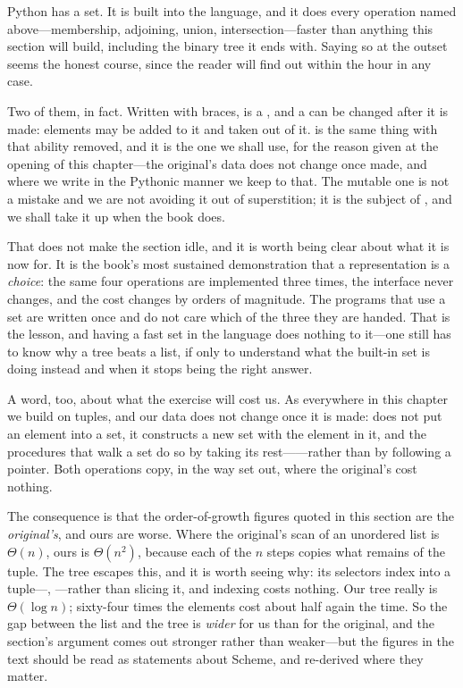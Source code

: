 \begin{revealTheSurface}
Python has a set.  It is built into the language, and it does every operation
named above---membership, adjoining, union, intersection---faster than anything
this section will build, including the binary tree it ends with.  Saying so at
the outset seems the honest course, since the reader will find out within the
hour in any case.

Two of them, in fact.  Written with braces,  is a ,
and a  can be changed after it is made: elements may be added to it
and taken out of it.   is the same thing with that
ability removed, and it is the one we shall use, for the reason given at the
opening of this chapter---the original's data does not change once made, and
where we write in the Pythonic manner we keep to that.  The mutable one is not
a mistake and we are not avoiding it out of superstition; it is the subject of
, and we shall take it up when the book does.

That does not make the section idle, and it is worth being clear about what it
is now for.  It is the book's most sustained demonstration that a
representation is a \emph{choice}: the same four operations are implemented
three times, the interface never changes, and the cost changes by orders of
magnitude.  The programs that use a set are written once and do not care which
of the three they are handed.  That is the lesson, and having a fast set in the
language does nothing to it---one still has to know why a tree beats a list, if
only to understand what the built-in set is doing instead and when it stops
being the right answer.

A word, too, about what the exercise will cost us.  As everywhere in this
chapter we build on tuples, and our data does not change once it is made:
 does not put an element into a set, it constructs a new set
with the element in it, and the procedures that walk a set do so by taking its
rest------rather than by following a pointer.  Both operations
copy, in the way  set out, where the original's cost
nothing.

The consequence is that the order-of-growth figures quoted in this section are
the \emph{original's}, and ours are worse.  Where the original's scan of an
unordered list is \( \Theta(n) \), ours is \( \Theta(n^2) \), because each of
the \( n \) steps copies what remains of the tuple.  The tree escapes this, and
it is worth seeing why: its selectors index into a tuple---,
---rather than slicing it, and indexing costs nothing.  Our tree
really is \( \Theta(\log n) \); sixty-four times the elements cost about half
again the time.  So the gap between the list and the tree is \emph{wider} for
us than for the original, and the section's argument comes out stronger rather
than weaker---but the figures in the text should be read as statements about
Scheme, and re-derived where they matter.


\end{revealTheSurface}
